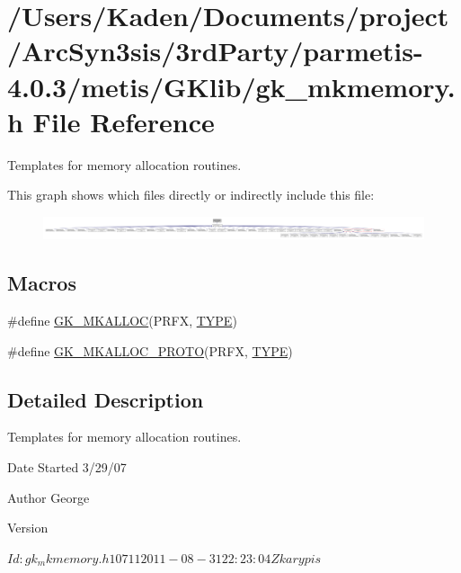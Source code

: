 \hypertarget{a00059}{}\section{/\+Users/\+Kaden/\+Documents/project/\+Arc\+Syn3sis/3rd\+Party/parmetis-\/4.0.3/metis/\+G\+Klib/gk\+\_\+mkmemory.h File Reference}
\label{a00059}


Templates for memory allocation routines.  


This graph shows which files directly or indirectly include this file\+:\nopagebreak
\begin{figure}[H]
\begin{center}
\leavevmode
\includegraphics[width=350pt]{a00061}
\end{center}
\end{figure}
\subsection*{Macros}
\begin{DoxyCompactItemize}
\item 
\#define \hyperlink{a00059_a4d2fab02606ca7a548d7565edd19dcaa}{G\+K\+\_\+\+M\+K\+A\+L\+L\+OC}(P\+R\+FX,  \hyperlink{a00608_a0bc6723d5d4776ab7cdc646728b775f7}{T\+Y\+PE})
\item 
\#define \hyperlink{a00059_a403c8a17c0991b4067dc8a720df03998}{G\+K\+\_\+\+M\+K\+A\+L\+L\+O\+C\+\_\+\+P\+R\+O\+TO}(P\+R\+FX,  \hyperlink{a00608_a0bc6723d5d4776ab7cdc646728b775f7}{T\+Y\+PE})
\end{DoxyCompactItemize}


\subsection{Detailed Description}
Templates for memory allocation routines. 

\begin{DoxyDate}{Date}
Started 3/29/07 
\end{DoxyDate}
\begin{DoxyAuthor}{Author}
George 
\end{DoxyAuthor}
\begin{DoxyVersion}{Version}
\begin{DoxyVerb}$Id: gk_mkmemory.h 10711 2011-08-31 22:23:04Z karypis $ \end{DoxyVerb}
 
\end{DoxyVersion}


